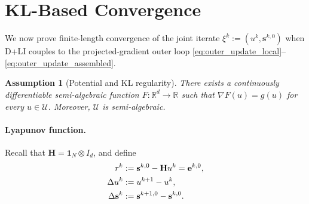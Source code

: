 \documentclass[letterpaper, 10 pt, conference]{ieeeconf} %
\newtheorem{assumption}{Assumption}
\begin{document}
\section{KL-Based Convergence}
\label{sec:kl}
We now prove finite-length convergence of the joint iterate $\xi^k:=(u^k,\mathbf s^{k,0})$ when D+LI couples to the projected-gradient outer loop \eqref{eq:outer_update_local}--\eqref{eq:outer_update_assembled}.

\begin{assumption}[Potential and KL regularity]
\label{ass:kl}
There exists a continuously differentiable semi-algebraic function \(F:\mathbb R^d\to\mathbb R\) such that
\(\nabla F(u)=g(u)\) for every \(u\in\mathcal U\).
Moreover, \(\mathcal U\) is semi-algebraic.
\end{assumption}

\paragraph{Lyapunov function.}
Recall that \(\mathbf H=\mathbf 1_N\otimes I_d\), and define
\begin{align}
r^k
&:=\mathbf s^{k,0}-\mathbf H u^k=\mathbf e^{k,0},
\notag\\
\Delta u^k
&:=u^{k+1}-u^k,
\notag\\
\Delta\mathbf s^k
&:=\mathbf s^{k+1,0}-\mathbf s^{k,0}.
\end{align}
\end{document}
